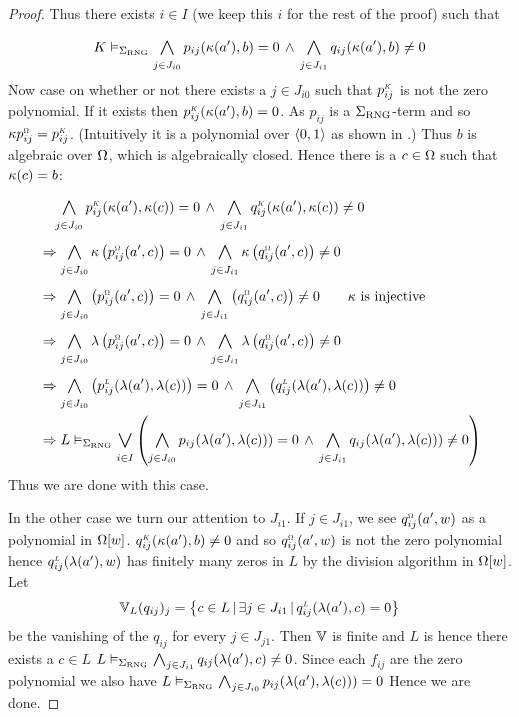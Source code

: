 \begin{proof}
    Thus there exists $i \in I$ (we keep this $i$ for the rest of the proof) 
    such that 
    \[
        K \model{\Si_\RNG} \bigand{j \in J_{i0}}{} p_{ij}(\ka(a'),b) = 0 \AND 
        \bigand{j \in J_{i1}}{} q_{ij}(\ka(a'),b) \ne 0
    \]
    Now case on whether or not there exists a $j \in J_{i0}$ such that 
    $\modintp{K}{p_{ij}}$ is not the zero polynomial.
    If it exists then $\modintp{K}{p_{ij}}(\ka(a'),b) = 0$.
    As $p_{ij}$ is a $\Sigma_{\mathrm{RNG}}$-term and so 
    $\ka \modintp{\Om}{p_{ij}} = \modintp{K}{p_{ij}}$.
    (Intuitively it is a polynomial over $\langle0,1\rangle$ as shown in
    .)
    Thus $b$ is algebraic over $\Omega$, which is algebraically closed.
    Hence there is a $c \in \Omega$ such that $\kappa (c) = b$:
\begin{align*}
    &\quad 
        \bigand{j \in J_{i0}}{} \modintp{K}{p_{ij}}(\ka(a'),\ka(c)) = 0 \AND 
        \bigand{j \in J_{i1}}{} \modintp{K}{q_{ij}}(\ka(a'),\ka(c)) \ne 0 \\
    &\implies 
        \bigand{j \in J_{i0}}{} \ka \brkt{\modintp{\Om}{p_{ij}}(a',c)} = 0 \AND 
        \bigand{j \in J_{i1}}{} \ka \brkt{\modintp{\Om}{q_{ij}}(a',c)} \ne 0 \\
    &\implies
        \bigand{j \in J_{i0}}{} \brkt{\modintp{\Om}{p_{ij}}(a',c)} = 0 \AND 
        \bigand{j \in J_{i1}}{} \brkt{\modintp{\Om}{q_{ij}}(a',c)} \ne 0 
    \quad \quad \ka \text{ is injective} \\
    &\implies 
        \bigand{j \in J_{i0}}{} \la \brkt{\modintp{\Om}{p_{ij}}(a',c)} = 0 \AND 
        \bigand{j \in J_{i1}}{} \la \brkt{\modintp{\Om}{q_{ij}}(a',c)} \ne 0 \\
    &\implies
       \bigand{j \in J_{i0}}{} \brkt{\modintp{L}{p_{ij}}(\la(a'),\la(c))} = 0\AND 
       \bigand{j \in J_{i1}}{} \brkt{\modintp{L}{q_{ij}}(\la(a'),\la(c))} \ne 0\\
    &\implies
    L \model{\Si_\RNG} \bigor{i \in I}{} 
        \brkt{\bigand{j \in J_{i0}}{} p_{ij}(\la(a'),\la(c))) = 0 \AND 
        \bigand{j \in J_{i1}}{} q_{ij}(\la(a'),\la(c))) \ne 0}
\end{align*}
    Thus we are done with this case.
    
    In the other case we turn our attention to $J_{i1}$.
    If $j \in J_{i1}$, 
    we see $\modintp{\Om}{q_{ij}}(a',w)$ as a polynomial
    in $\Omega[w]$.
    $\modintp{K}{q_{ij}}(\ka(a'),b) \ne 0$ and so 
    $\modintp{\Om}{q_{ij}}(a',w)$ is not the zero polynomial
    hence $\modintp{L}{q_{ij}}(\la(a'),w)$
    has finitely many zeros in $L$ by the division algorithm in 
    $\Omega[w]$.
    Let 
    \[\V_L(q_{ij})_{j} = \set{c \in L \st \exists j \in J_{i1} 
    \st \modintp{L}{q_{ij}}(\la(a'),c) = 0}\]
    be the vanishing of the $q_{ij}$ for every $j \in J_{j1}$.
    Then $\mathbb{V}$ is finite and $L$ is 
    hence there exists a $c \in L$ 
    $L \model{\Si_\RNG} \bigand{j \in J_{i1}}{} q_{ij}(\la(a'),c) \ne 0$.
    Since each $f_{ij}$ are the zero polynomial we also have
    $L \model{\Si_\RNG} \bigand{j \in J_{i0}}{} p_{ij}(\la(a'),\la(c))) = 0$
    Hence we are done.
\end{proof}

